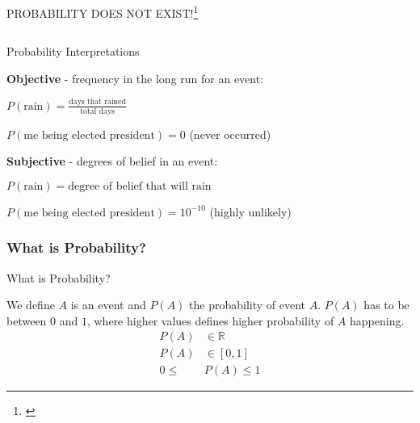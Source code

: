 \begin{frame}{PROBABILITY DOES NOT EXIST!\footnote{\textcite{definettiTheoryProbability1974}}}
\begin{columns}
\begin{column}{0.4\textwidth}
		\end{column}
	\end{columns}
\end{frame}

\begin{frame}{Probability Interpretations}
	\begin{vfilleditems}
		\item \textbf{Objective} - frequency in the long run for an event:
		\begin{vfilleditems}
			\item $P(\text{rain}) = \frac{\text{days that rained}}{\text{total days}}$
			\item $P(\text{me being elected president}) = 0$ (never occurred)
		\end{vfilleditems}
		\item \textbf{Subjective} - degrees of belief in an event:
		\begin{vfilleditems}
			\item $P(\text{rain}) = \text{degree of belief that will rain}$
			\item $P(\text{me being elected president}) = 10^{-10}$ (highly unlikely)
		\end{vfilleditems}
	\end{vfilleditems}
\end{frame}

\subsubsection{What is Probability?}
\begin{frame}{What is Probability?}
	\begin{defn}[Probability]
		We define $A$ is an event and $P(A)$ the probability of event $A$.
		$P(A)$ has to be between $0$ and $1$, where higher values defines
		higher probability of $A$ happening.
		$$\begin{aligned}
				P(A)   & \in \mathbb{R} \\
				P(A)   & \in [0,1]      \\
				0 \leq & P(A) \leq 1
			\end{aligned}$$
	\end{defn}
\end{frame}

